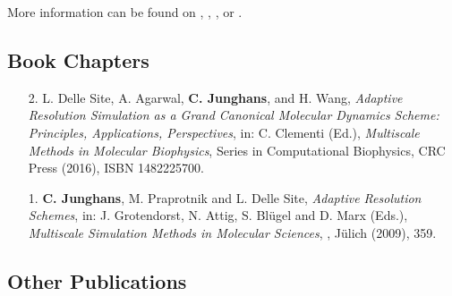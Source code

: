 \documentclass{article}
\begin{document}
More information can be found on , , ,  or .

\subsection*{Book Chapters}

\begin{enumerate}
\item[2.] L. Delle Site, A. Agarwal, \textbf{C. Junghans}, and H. Wang, 
  \textit{Adaptive Resolution Simulation as a Grand Canonical Molecular Dynamics Scheme: Principles, Applications, Perspectives},
  in: C. Clementi (Ed.),
  \textit{Multiscale Methods in Molecular Biophysics},
  Series in Computational Biophysics, CRC Press (2016), ISBN 1482225700.

\item[1.] \textbf{C. Junghans}, M. Praprotnik and L. Delle Site,
  \textit{Adaptive Resolution Schemes},
  in: J. Grotendorst, N. Attig, S. Bl{\"u}gel and D. Marx (Eds.),
  \textit{Multiscale Simulation Methods in Molecular Sciences}, , J{\"u}lich (2009), 359.
\end{enumerate}

\subsection*{Other Publications}
\end{document}
